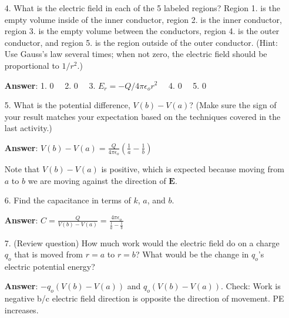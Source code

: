 \documentclass{article}
\begin{document}
\begin{enumerate}

  \item[4.] What is the electric field in each of the 5 labeled regions? Region 1. is the empty volume inside of the inner conductor, region 2. is the inner conductor, region 3. is the empty volume between the conductors, region 4. is the outer conductor, and region 5. is the region outside of the outer conductor. (Hint: Use Gauss's law several times; when not zero, the electric field should be proportional to $1/r^2$.)

     \ifsolutions
       \textbf{Answer}: 1. $0\quad$ 2. $0\quad$ 3. $E_r=-Q/4\pi \epsilon_o r^2\quad$ 4. $0\quad$ 5. $0$
     \else
       \vskip 48pt
     \fi
     \ifsolutions\else
     \vskip 48pt
     \fi

  \item[5.] What is the potential difference, $V(b) - V(a)$? (Make sure the sign of your result matches your expectation based on the techniques covered in the last activity.)

     \ifsolutions
       \textbf{Answer}: $\displaystyle V(b)-V(a)=\frac{Q}{4\pi\epsilon_o}\left(\frac{1}{a}-\frac{1}{b}\right)$

       Note that $V(b)-V(a)$ is positive, which is expected because moving from $a$ to $b$ we are moving against the direction of $\mathbf{E}$.
     \else
       \vskip 48pt
     \fi
     \ifsolutions\else
     \vskip 48pt
     \fi

  \item[6.] Find the capacitance in terms of $k$, $a$, and $b$.

     \ifsolutions
       \textbf{Answer}: $\displaystyle C=\frac{Q}{V(b)-V(a)} = \frac{4\pi\epsilon_o}{\frac{1}{a}-\frac{1}{b}}$
     \else
       \vskip 48pt
     \fi
     \ifsolutions\else
     \vskip 48pt
     \fi

  \item[7.] (Review question) How much work would the electric field do on a charge $q_o$ that is moved from $r=a$ to $r=b$? What would be the change in $q_o$'s electric potential energy?

     \ifsolutions
       \textbf{Answer}: $-q_o(V(b)-V(a))$ and $q_o(V(b)-V(a))$. Check: Work is negative b/c electric field direction is opposite the direction of movement. PE increases.
     \fi

\end{enumerate}
\end{document}
